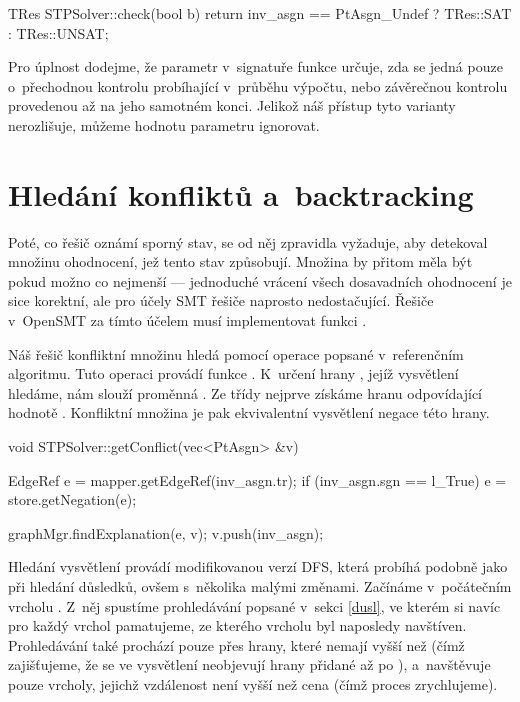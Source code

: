 \begin{code}
TRes STPSolver::check(bool b) { 
	return inv_asgn == PtAsgn_Undef ? TRes::SAT : TRes::UNSAT; 
}
\end{code}
Pro úplnost dodejme, že parametr  v~signatuře funkce  určuje, zda se jedná pouze o~přechodnou kontrolu probíhající v~průběhu výpočtu, nebo závěrečnou kontrolu provedenou až na jeho samotném konci. Jelikož náš přístup tyto varianty nerozlišuje, můžeme hodnotu parametru ignorovat.

\section{Hledání konfliktů a~backtracking}

Poté, co řešič oznámí sporný stav, se od něj zpravidla vyžaduje, aby detekoval množinu ohodnocení, jež tento stav způsobují. Množina by přitom měla být pokud možno co nejmenší --- jednoduché vrácení všech dosavadních ohodnocení je sice korektní, ale pro účely SMT řešiče naprosto nedostačující. Řešiče v~OpenSMT za tímto účelem musí implementovat funkci .

Náš řešič konfliktní množinu hledá pomocí operace  popsané v~referenčním algoritmu. Tuto operaci provádí funkce . K~určení hrany , jejíž vysvětlení hledáme, nám slouží proměnná . Ze třídy  nejprve získáme hranu odpovídající hodnotě . Konfliktní množina je pak ekvivalentní vysvětlení negace této hrany. 

\begin{code}
void STPSolver::getConflict(vec<PtAsgn> &v) {
	EdgeRef e = mapper.getEdgeRef(inv_asgn.tr);
	if (inv_asgn.sgn == l_True)
	    e = store.getNegation(e);
	
	graphMgr.findExplanation(e, v);
	v.push(inv_asgn);
}
\end{code}

Hledání vysvětlení provádí  modifikovanou verzí DFS, která probíhá podobně jako při hledání důsledků, ovšem s~několika malými změnami. Začínáme v~počátečním vrcholu . Z~něj spustíme prohledávání popsané v~sekci \ref{dusl}, ve kterém si navíc pro každý vrchol pamatujeme, ze kterého vrcholu byl naposledy navštíven. Prohledávání také prochází pouze přes hrany, které nemají  vyšší než  (čímž zajišťujeme, že se ve vysvětlení neobjevují hrany přidané až po ), a~navštěvuje pouze vrcholy, jejichž vzdálenost není vyšší než cena  (čímž proces zrychlujeme).

